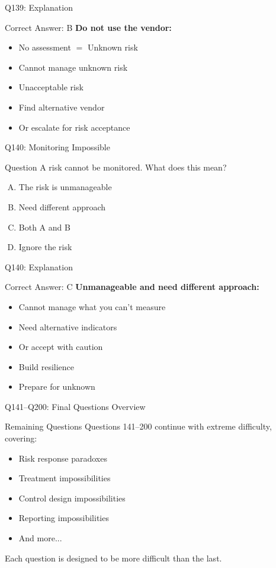 \documentclass{beamer}
\begin{document}
	\begin{frame}{Q139: Explanation}
		\begin{block}{Correct Answer: B}
			\textbf{Do not use the vendor:}
			\begin{itemize}
				\item No assessment $=$ Unknown risk
				\item Cannot manage unknown risk
				\item Unacceptable risk
				\item Find alternative vendor
				\item Or escalate for risk acceptance
			\end{itemize}
		\end{block}
	\end{frame}
	
	\begin{frame}{Q140: Monitoring Impossible}
		\begin{block}{Question}
			A risk cannot be monitored. What does this mean?
		\end{block}
		\begin{enumerate}[(A)]
			\item The risk is unmanageable
			\item Need different approach
			\item Both A and B
			\item Ignore the risk
		\end{enumerate}
	\end{frame}
	
	\begin{frame}{Q140: Explanation}
		\begin{block}{Correct Answer: C}
			\textbf{Unmanageable and need different approach:}
			\begin{itemize}
				\item Cannot manage what you can't measure
				\item Need alternative indicators
				\item Or accept with caution
				\item Build resilience
				\item Prepare for unknown
			\end{itemize}
		\end{block}
	\end{frame}
	
	\begin{frame}{Q141--Q200: Final Questions Overview}
		\begin{block}{Remaining Questions}
			Questions 141--200 continue with extreme difficulty, covering:
			\begin{itemize}
				\item Risk response paradoxes
				\item Treatment impossibilities
				\item Control design impossibilities
				\item Reporting impossibilities
				\item And more...
			\end{itemize}
			Each question is designed to be more difficult than the last.
		\end{block}
	\end{frame}
	
\end{document}
